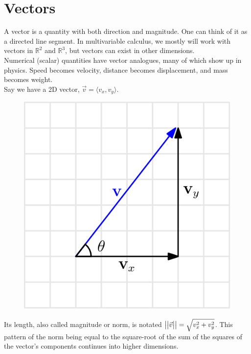 \section{Vectors}
\noindent
A vector is a quantity with both direction and magnitude. One can think of it as a directed line segment. In multivariable calculus, we mostly will work with vectors in $\mathbb{R}^2$ and $\mathbb{R}^3$, but vectors can exist in other dimensions.\\

\noindent
Numerical (scalar) quantities have vector analogues, many of which show up in physics. Speed becomes velocity, distance becomes displacement, and mass becomes weight.\\

\noindent
Say we have a 2D vector, $\vec{v} = \langle v_x, v_y \rangle$.

\begin{figure}[H]
	\centering
	\includegraphics[scale=0.5]{Images/backgroundReview/VectorAddition}
\end{figure}

\noindent
Its length, also called magnitude or norm, is notated $\big\lvert \big\lvert \vec{v} \big\rvert \big\rvert = \sqrt{v_x^2+v_y^2}$. This pattern of the norm being equal to the square-root of the sum of the squares of the vector's components continues into higher dimensions.\\

